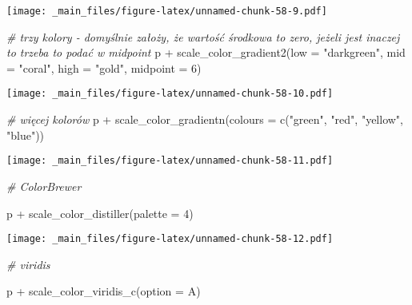 \documentclass[
]{book}
\newenvironment{Shaded}{\begin{snugshade}}{\end{snugshade}}
\newcommand{\AttributeTok}[1]{\textcolor[rgb]{0.77,0.63,0.00}{#1}}
\newcommand{\CommentTok}[1]{\textcolor[rgb]{0.56,0.35,0.01}{\textit{#1}}}
\newcommand{\DecValTok}[1]{\textcolor[rgb]{0.00,0.00,0.81}{#1}}
\newcommand{\FunctionTok}[1]{\textcolor[rgb]{0.00,0.00,0.00}{#1}}
\newcommand{\NormalTok}[1]{#1}
\newcommand{\SpecialCharTok}[1]{\textcolor[rgb]{0.00,0.00,0.00}{#1}}
\newcommand{\StringTok}[1]{\textcolor[rgb]{0.31,0.60,0.02}{#1}}
\begin{document}
\texttt{[image: \_main\_files/figure-latex/unnamed-chunk-58-9.pdf]}

\begin{Shaded}
\begin{Highlighting}[]
\CommentTok{\# trzy kolory {-} domyślnie założy, że wartość środkowa to zero, jeżeli jest inaczej to trzeba to podać w midpoint}
\NormalTok{p }\SpecialCharTok{+} \FunctionTok{scale\_color\_gradient2}\NormalTok{(}\AttributeTok{low =} \StringTok{"darkgreen"}\NormalTok{, }\AttributeTok{mid =} \StringTok{"coral"}\NormalTok{, }\AttributeTok{high =} \StringTok{"gold"}\NormalTok{, }\AttributeTok{midpoint =} \DecValTok{6}\NormalTok{)}
\end{Highlighting}
\end{Shaded}

\texttt{[image: \_main\_files/figure-latex/unnamed-chunk-58-10.pdf]}

\begin{Shaded}
\begin{Highlighting}[]
\CommentTok{\# więcej kolorów}
\NormalTok{p }\SpecialCharTok{+} \FunctionTok{scale\_color\_gradientn}\NormalTok{(}\AttributeTok{colours =} \FunctionTok{c}\NormalTok{(}\StringTok{"green"}\NormalTok{, }\StringTok{"red"}\NormalTok{, }\StringTok{"yellow"}\NormalTok{, }\StringTok{"blue"}\NormalTok{))}
\end{Highlighting}
\end{Shaded}

\texttt{[image: \_main\_files/figure-latex/unnamed-chunk-58-11.pdf]}

\begin{Shaded}
\begin{Highlighting}[]
\CommentTok{\# ColorBrewer}

\NormalTok{p }\SpecialCharTok{+} \FunctionTok{scale\_color\_distiller}\NormalTok{(}\AttributeTok{palette =} \DecValTok{4}\NormalTok{)}
\end{Highlighting}
\end{Shaded}

\texttt{[image: \_main\_files/figure-latex/unnamed-chunk-58-12.pdf]}

\begin{Shaded}
\begin{Highlighting}[]
\CommentTok{\# viridis}

\NormalTok{p }\SpecialCharTok{+} \FunctionTok{scale\_color\_viridis\_c}\NormalTok{(}\AttributeTok{option =} \StringTok{\textquotesingle{}A\textquotesingle{}}\NormalTok{)}
\end{Highlighting}
\end{Shaded}
\end{document}
